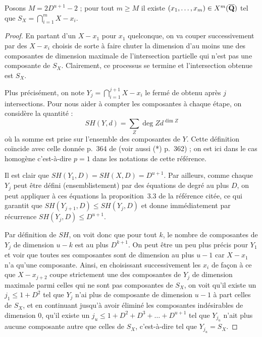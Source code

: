 \begin{lem}
  Posons \( M = 2 D^{u+1} - 2 \) ; pour tout \( m \ge M \) il existe
  \( (x_1, \dots, x_m) \in X^m(\overline{{\mathbf{Q}}}) \) tel que
  \( S_X = \bigcap_{i=1}^m X - x_i \).
\end{lem}

\begin{proof}
  En partant d'un \( X - x_1 \) pour \( x_1 \) quelconque, on va couper
  successivement par des \( X - x_i \) choisis de sorte à faire chuter la
  dimension d'au moins une des composantes de dimension maximale de
  l'intersection partielle qui n'est pas une composante de \( S_X \).
  Clairement, ce processus se termine et l'intersection obtenue est \( S_X \).

  Plus précisément, on note \( Y_j = \bigcap_{i=1}^{j+1} X - x_i \) le fermé de
   obtenu après \( j \) intersections.  Pour nous aider à
  compter les composantes à chaque étape, on considère la quantité :
  \begin{equation}
    SH(Y, d)
    =
    \sum_Z \deg Z d^{\dim Z}
  \end{equation}
  où la somme est prise sur l'ensemble des composantes de \( Y \). Cette
  définition coïncide avec celle donnée p.~364 de \cite{philz} (voir aussi (*)
  p.~362) ; on est ici dans le cas homogène c'est-à-dire \( p = 1 \) dans les
  notations de cette référence.

  Il est clair que \( SH(Y_1, D) = SH(X, D) = D^{u+1} \). Par ailleurs, comme
  chaque \( Y_j \) peut être défini (ensemblistement) par des équations de
  degré au plus \( D \), on peut appliquer à ces équations la proposition~3.3
  de la référence citée, ce qui garantit que \( SH(Y_{j+1}, D) \le SH(Y_j, D)
  \) et donne immédiatement par récurrence \( SH(Y_j, D) \le D^{u+1} \).

  Par définition de \( SH \), on voit donc que pour tout \( k \), le nombre de
  composantes de \( Y_j \) de dimension \( u - k \) est au plus \( D^{k+1} \).
  On peut être un peu plus précis pour \( Y_1 \) et voir que toutes ses
  composantes sont de dimension au plus \( u - 1 \) car \( X - x_1 \) n'a
  qu'une composante. Ainsi, en choisissant successivement les \( x_i \) de
  façon à ce que \( X - x_{j+2} \) coupe strictement une des composantes de \(
    Y_j \) de dimension maximale parmi celles qui ne sont pas composantes de \(
    S_X \), on voit qu'il existe un \( j_1 \le 1 + D^2 \) tel que \( Y_j \) n'ai
  plus de composante de dimension \( u - 1 \) à part celles de \( S_X \), et
  en continuant jusqu'à avoir éliminé les composantes indésirables de
  dimension \( 0 \), qu'il existe un \( j_u \le 1 + D^2 + D^3 + \dots +
    D^{u+1} \) tel que \( Y_{j_u} \) n'ait plus aucune composante autre que
  celles de \( S_X \), c'est-à-dire tel que \( Y_{j_u} = S_X \).


\end{proof}
